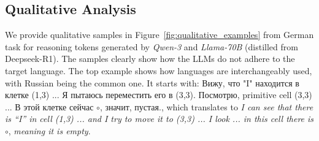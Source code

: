 \documentclass[11pt]{article}
\begin{document}




\subsection{Qualitative Analysis}



We provide qualitative samples in Figure~\ref{fig:qualitative_examples} from German task for reasoning tokens generated by \textit{Qwen-3} and \textit{Llama-70B} (distilled from Deepseek-R1). The samples clearly show how the LLMs do not adhere to the target language. The top example shows how languages are interchangeably used, with Russian being the common one. It starts with: \foreignlanguage{russian}{Вижу, что} "I" \foreignlanguage{russian}{находится в клетке (1,3) ... Я пытаюсь переместить его в (3,3). Посмотрю,} primitive cell (3,3) \foreignlanguage{russian}{... В этой клетке сейчас $\circ$, значит, пустая.}, which translates to \textit{I can see that there is ``I'' in cell (1,3) ... and I try to move it  to (3,3) ... I look ... in this cell there is} $\circ$, \textit{meaning it is empty}. 
\end{document}
